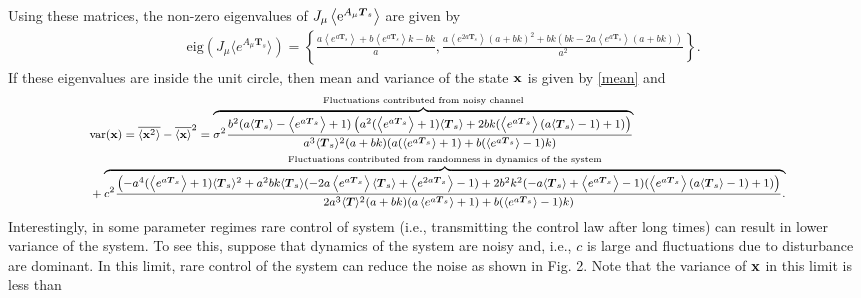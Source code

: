 \documentclass[letterpaper, 10 pt,one column, conference]{ieeeconf}  %
\begin{document}
Using these matrices, the non-zero eigenvalues of $J_\mu\left\langle {\rm e}^{A_\mu \boldsymbol T_s }\right\rangle $ are given by
\begin{equation}
\begin{aligned}
&\text{eig}\left(J_\mu \langle e^{A_\mu \boldsymbol T_s} \rangle  \right)=\left \{ \frac{a\left \langle e^{a \boldsymbol T_s} \right \rangle +b \left \langle e^{a \boldsymbol T_s} \right \rangle  k-b k}{a},
\frac{a\left \langle e^{2 a \boldsymbol T_s} \right \rangle   (a+b k)^2+b k (b k-2 a\left \langle e^{a \boldsymbol T_s} \right \rangle   (a+b k))}{a^2}\right \}. \label{eig}
\end{aligned}
\end{equation}
If these eigenvalues are inside the unit circle, then mean and variance of the state $\bold x$ is given by \eqref{mean} and 
\begin{equation}\footnotesize
\begin{aligned}
& \text{var}(\bold x )= \overline{\langle \bold x^2 \rangle }-\overline{\langle \bold x \rangle }^2=\overbrace{\sigma^2 \frac{b^2 (a \langle \boldsymbol T_s \rangle - \left \langle e^{a\boldsymbol T_s }\right \rangle +1) \left(a^2 (\left \langle e^{a\boldsymbol T_s }\right \rangle+1) \langle \boldsymbol T_s \rangle +2 b k (\left \langle e^{a\boldsymbol T_s }\right \rangle (a \langle \boldsymbol T_s \rangle -1)+1)\right)}{a^3 \langle \boldsymbol T_s \rangle ^2 (a+b k) (a (\left \langle e^{a\boldsymbol T_s }\right \rangle +1)+b (\left \langle e^{a\boldsymbol T_s }\right \rangle -1) k)}}^\text{Fluctuations contributed from noisy channel}\\ 
& + \overbrace{c^2 \frac{\left(-a^4 (\left \langle e^{a\boldsymbol T_s }\right \rangle  +1) \langle \boldsymbol T_s \rangle ^2+a^2 b k \langle \boldsymbol T_s \rangle  (-2 a \left \langle e^{a\boldsymbol T_s }\right \rangle  \langle \boldsymbol T_s \rangle +\left \langle e^{2a\boldsymbol T_s }\right \rangle -1)+2 b^2 k^2 (-a \langle \boldsymbol T_s \rangle +\left \langle e^{a\boldsymbol T_s }\right \rangle  -1) (\left \langle e^{a\boldsymbol T_s }\right \rangle  (a \langle \boldsymbol T_s \rangle -1)+1)\right)}{2 a^3 \langle \boldsymbol T\rangle ^2 (a+b k) (a \left \langle e^{a\boldsymbol T_s }\right \rangle  +1)+b (\left \langle e^{a\boldsymbol T_s }\right \rangle  -1) k)}.}^\text{Fluctuations contributed from randomness in dynamics of the system}
\end{aligned} 
\label{noise}
\end{equation}
Interestingly, in some parameter regimes rare control of system (i.e., transmitting the control law after long times) can result in lower variance of the system. To see this, suppose that dynamics of the system are noisy and, i.e., $c$ is large and fluctuations due to disturbance are dominant. In this limit, rare control of the system can reduce the noise as shown in Fig. 2. Note that the variance of $\bold x$ in this limit is less than
\end{document}
